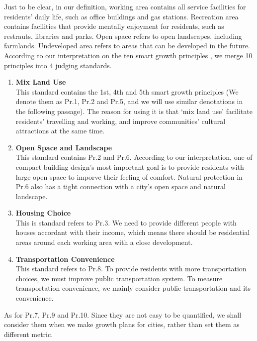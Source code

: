 Just to be clear, in our definition, working area contains all service facilities for residents' daily life, such as office buildings and gas stations.
Recreation area contains facilities that provide mentally enjoyment for residents, such as restrauts, libraries and parks.
Open space refers to open landscapes, including farmlands.
Undeveloped area refers to areas that can be developed in the future.\\

According to our interpretation on the ten smart growth principles \cite{pdf:smart-growth}, we merge 10 principles into 4 judging standards.
\begin{enumerate}
  \item \textbf{Mix Land Use}\\
  This standard contains the 1st, 4th and 5th smart growth principles (We denote them as Pr.1, Pr.2 and Pr.5, and we will use similar denotations in the following passage). The reason for using it is that `mix land use' facilitate residents' travelling and working, and improve communities' cultural attractions at the same time.
  \item \textbf{Open Space and Landscape}\\
  This standard contains Pr.2 and Pr.6. According to our interpretation, one of compact building design's most important goal is to provide residents with large open space to imporve their feeling of comfort. Natural protection in Pr.6 also has a tight connection with a city's open space and natural landscape.
  \item \textbf{Housing Choice}\\
  This is standard refers to Pr.3. We need to provide different people with houses accordant with their income, which means there should be residential areas around each working area with a close development.
  \item \textbf{Transportation Convenience}\\
  This standard refers to Pr.8. To provide residents with more transportation choices, we must improve public transportation system. To measure transportation convenience, we mainly consider public transportation and its convenience.
\end{enumerate}

As for Pr.7, Pr.9 and Pr.10. Since they are not easy to be quantified, we shall consider them when we make growth plans for cities, rather than set them as different metric.


